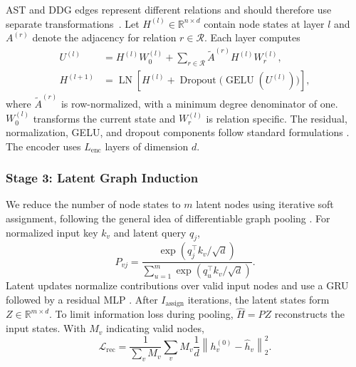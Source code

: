 \documentclass[final,5p,times,twocolumn]{elsarticle}
\theoremstyle{plain}
\begin{document}
AST and DDG edges represent different relations and should therefore use separate transformations~\cite{schlichtkrull2018modeling}. Let $H^{(l)}\in\mathbb{R}^{n\times d}$ contain node states at layer $l$ and $A^{(r)}$ denote the adjacency for relation $r\in\mathcal{R}$. Each layer computes
\begin{equation}
\begin{aligned}
U^{(l)}
&=
H^{(l)}W_0^{(l)}
+
\sum_{r\in\mathcal{R}}
\widetilde{A}^{(r)}H^{(l)}W_r^{(l)},\\
H^{(l+1)}
&=
\operatorname{LN}\!\left[
H^{(l)}
+
\operatorname{Dropout}
\bigl(\operatorname{GELU}(U^{(l)})\bigr)
\right],
\end{aligned}
\label{eq:revised_relation_layer}
\end{equation}
where $\widetilde{A}^{(r)}$ is row-normalized, with a minimum degree denominator of one. $W_0^{(l)}$ transforms the current state and $W_r^{(l)}$ is relation specific. The residual, normalization, GELU, and dropout components follow standard
formulations \cite{he2016deep,ba2016layer,hendrycks2016gaussian,srivastava2014dropout}. The encoder uses $L_{\mathrm{enc}}$ layers of dimension $d$.


\subsubsection{Stage 3: Latent Graph Induction}
\label{sec:revised_latent_induction}

We reduce the number of node states to $m$ latent nodes using iterative soft
assignment, following the general idea of differentiable graph pooling
\cite{ying2018hierarchical}. For normalized input key $k_v$ and latent query $q_j$,
\begin{equation}
P_{vj}
=
\frac{\exp(q_j^{\top}k_v/\sqrt{d})}
{\sum_{u=1}^{m}\exp(q_u^{\top}k_v/\sqrt{d})}.
\label{eq:revised_slot_assignment}
\end{equation}
Latent updates normalize contributions over valid input nodes and use a GRU followed by a residual MLP \cite{cho2014gru,he2016resnet}. After $I_{\mathrm{assign}}$ iterations, the latent states form $Z\in\mathbb{R}^{m\times d}$. To limit information loss during pooling, $\widehat{H}=PZ$ reconstructs the input states. With $M_v$ indicating valid nodes,
\begin{equation}
\mathcal{L}_{\mathrm{rec}}
=
\frac{1}{\sum_v M_v}
\sum_v
M_v
\frac{1}{d}
\left\|
h_v^{(0)}-\widehat{h}_v
\right\|_2^2.
\label{eq:revised_reconstruction_loss}
\end{equation}
\end{document}
